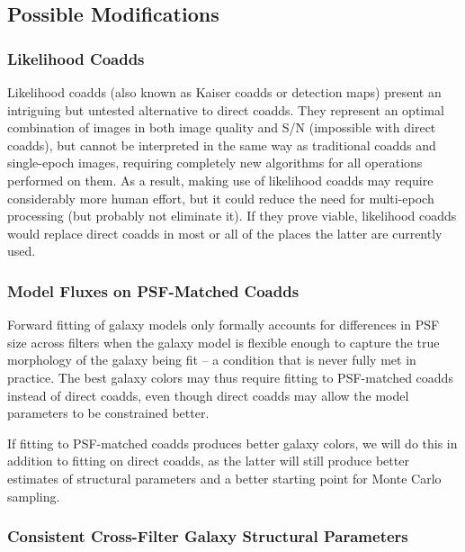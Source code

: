 \documentclass[10pt]{article}
\begin{document}
\subsection{Possible Modifications}
\label{sec:alternatives}

\subsubsection{Likelihood Coadds}

\label{sec:likelihood-coadds}

Likelihood coadds (also known as Kaiser coadds or detection maps) present an
intriguing but untested alternative to direct coadds.  They represent an
optimal combination of images in both image quality and S/N (impossible with
direct coadds), but cannot be interpreted in the same way as traditional
coadds and single-epoch images, requiring completely new algorithms for all
operations performed on them.  As a result, making use of likelihood coadds
may require considerably more human effort, but it could reduce the need for
multi-epoch processing (but probably not eliminate it). If they prove viable,
likelihood coadds would replace direct coadds in most or all of the places the
latter are currently used.

\subsubsection{Model Fluxes on PSF-Matched Coadds}

\label{sec:models-on-psf-matched-coadds}

Forward fitting of galaxy models only formally accounts for differences in PSF
size across filters when the galaxy model is flexible enough to capture the
true morphology of the galaxy being fit -- a condition that is never fully
met in practice.  The best galaxy colors may thus require fitting to
PSF-matched coadds instead of direct coadds, even though direct coadds may
allow the model parameters to be constrained better.

If fitting to PSF-matched coadds produces better galaxy colors, we will do
this in addition to fitting on direct coadds, as the latter will still produce
better estimates of structural parameters and a better starting point for
Monte Carlo sampling.

\subsubsection{Consistent Cross-Filter Galaxy Structural Parameters}
\end{document}
